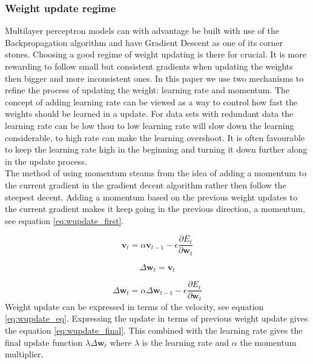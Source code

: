 \subsubsection{Weight update regime} \label{sss:weight_regime}
Multilayer perceptron models can with advantage be built with use of the Backpropagation algorithm and have Gradient Descent as one of its corner stones. Choosing a good regime of weight updating is there for crucial. It is more rewarding to follow small but consistent gradients when updating the weights then bigger and more inconsistent ones. In this paper we use two mechanisms to refine the process of updating the weight: learning rate and momentum. 
The concept of adding learning rate can be viewed as a way to control how fast the weights should be learned in a update. For data sets with redundant data the learning rate can be low thou to low learning rate will slow down the learning considerable, to high rate can make the learning overshoot. It is often favourable to keep the learning rate high in the beginning and turning it down further along in the update process.   
\\
The method of using momentum steams from the idea of adding a momentum to the current gradient in the gradient decent algorithm rather then follow the steepest decent. Adding a momentum based on the previous weight updates to the current gradient makes it keep going in the previous direction, a momentum, see equation \ref{eq:wupdate_first}. 

\begin{equation} \label{eq:wupdate_first}
 \mathbf{v}_{t} = \alpha \mathbf{v}_{t-1} - \epsilon \frac{\partial{E_{t}}}{\partial{\mathbf{w}_{t}}} 
\end{equation}

\begin{equation} \label{eq:wupdate_eq}
\Delta \mathbf{w}_{t} = \mathbf{v}_{t} 
\end{equation}

\begin{equation} \label{eq:wupdate_final}
\Delta \mathbf{w}_{t} = \alpha \Delta \mathbf{w}_{t-1} - \epsilon \frac{\partial{E_{t}}}{\partial{\mathbf{w}_{t}}} 
\end{equation}
Weight update can be expressed in terms of the velocity, see equation \ref{eq:wupdate_eq}. Expressing the update in terms of previous weight update gives the equation \ref{eq:wupdate_final}. This combined with the learning rate gives the final update function $\lambda \Delta \mathbf{w}_{t}$ where $\lambda$ is the learning rate and $\alpha$ the momentum multiplier.


